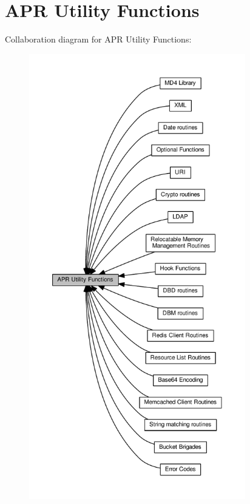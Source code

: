 \hypertarget{group__APR__Util}{}\section{A\+PR Utility Functions}
\label{group__APR__Util}
Collaboration diagram for A\+PR Utility Functions\+:
\nopagebreak
\begin{figure}[H]
\begin{center}
\leavevmode
\includegraphics[height=550pt]{group__APR__Util}
\end{center}
\end{figure}
